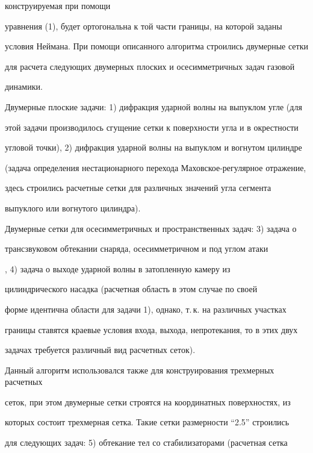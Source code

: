 конструируемая при помощи 


уравнения (1), будет ортогональна к той части границы, на которой заданы 


условия Ней\-мана. При помощи описанного алгоритма строились двумерные сетки 


для расчета следующих двумерных плоских и осесимметричных задач газовой 


динамики. 


 


Двумерные плоские задачи: 1) дифракция ударной волны на выпуклом угле (для 


этой задачи производилось сгущение сетки к поверхности угла и в окрестности 


угловой точки), 2) дифракция ударной волны на выпуклом и вогнутом цилиндре 


(задача определения нестационарного перехода Маховское-регулярное отражение, 


здесь строились расчетные сетки для различных значений угла сегмента 


выпуклого или вогнутого цилиндра). 


 


Двумерные сетки для осесимметричных и пространственных задач: 3) задача о 


трансзвуковом обтекании снаряда, осесимметричном и под углом атаки 


\cite{Mar1}, 4) задача о выходе ударной волны в затопленную камеру из 


цилиндрического насадка \cite{Mar2} (расчетная область в этом случае по своей 


форме идентична области для задачи 1), однако, т.\,к. на различных участках 


границы ставятся краевые условия входа, выхода, непротекания, то в этих двух 


задачах требуется различный вид расчетных сеток). 


 


Данный алгоритм использовался также для конструирования трехмерных расчетных 


сеток, при этом двумерные сетки строятся на координатных поверхностях, из 


которых состоит трехмерная сетка. Такие сетки размерности ``2.5'' строились 


для следующих задач: 5) обтекание тел со стабилизаторами (расчетная сетка 


